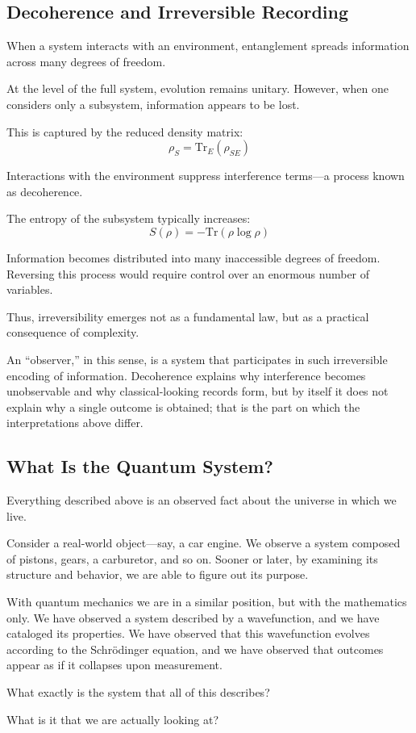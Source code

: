 \subsection*{Decoherence and Irreversible Recording}

When a system interacts with an environment, entanglement spreads information across many degrees of freedom.

At the level of the full system, evolution remains unitary. However, when one considers only a subsystem, information appears to be lost.

This is captured by the reduced density matrix:
\[
\rho_S = \mathrm{Tr}_E(\rho_{SE})
\]

Interactions with the environment suppress interference terms---a process known as decoherence.

The entropy of the subsystem typically increases:
\[
S(\rho) = -\mathrm{Tr}(\rho \log \rho)
\]

Information becomes distributed into many inaccessible degrees of freedom. Reversing this process would require control over an enormous number of variables.

Thus, irreversibility emerges not as a fundamental law, but as a practical consequence of complexity.

An ``observer,'' in this sense, is a system that participates in such irreversible encoding of information.
Decoherence explains why interference becomes unobservable and why classical-looking records form, but by itself it does not explain why a single outcome is obtained; that is the part on which the interpretations above differ.


\subsection*{What Is the Quantum System?}

Everything described above is an observed fact about the universe in which we live.

Consider a real-world object---say, a car engine. We observe a system composed of pistons, gears, a carburetor, and so on. 
Sooner or later, by examining its structure and behavior, we are able to figure out its purpose.

With quantum mechanics we are in a similar position, but with the mathematics only. 
We have observed a system described by a wavefunction, and we have cataloged its properties. 
We have observed that this wavefunction evolves according to the Schrödinger equation, and we have observed that outcomes appear as if it collapses upon measurement.

What exactly is the system that all of this describes? 

What is it that we are actually looking at?
